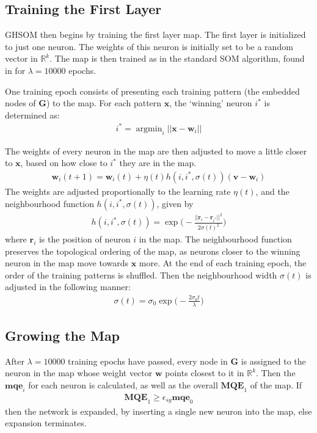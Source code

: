 \documentclass{article}
\DeclareMathOperator*{\argmin}{argmin}
\begin{document}
\subsection{Training the First Layer}
GHSOM then begins by training the first layer map. 
The first layer is initialized to just one neuron. 
The weights of this neuron is initially set to be a random vector in $\mathbb{R}^k$. 
The map is then trained as in the standard SOM algorithm, found in \cite{kohonen1990self} for $\lambda=10000$ epochs.

One training epoch consists of presenting each training pattern (the embedded nodes of $\textbf{G}$) to the map. 
For each pattern $\textbf{x}$, the `winning' neuron $i^*$ is determined as:
\begin{align}
i^* = \argmin_i  ||\textbf{x} - \textbf{w}_i||
\end{align}

The weights of every neuron in the map are then adjusted to move a little closer to $\textbf{x}$, based on how close to $i^*$ they are in the map.
\begin{align}
\textbf{w}_i(t+1) = \textbf{w}_i(t) + \eta(t) h(i, i^*, \sigma(t)) (\textbf{v} - \textbf{w}_i)
\end{align}
The weights are adjusted proportionally to the learning rate $\eta(t)$, and the neighbourhood function $h(i, i^*, \sigma(t))$, given by
\begin{align}
h(i, i^*, \sigma(t)) = \exp\Bigg(-\frac{||\textbf{r}_i-\textbf{r}_{i^*}||^2}{2\sigma(t)^2}\Bigg)
\end{align}
where $\textbf{r}_i$ is the position of neuron $i$ in the map.
The neighbourhood function preserves the topological ordering of the map, as neurons closer to the winning neuron in the map move towards $\textbf{x}$ more.
At the end of each training epoch, the order of the training patterns is shuffled. Then the neighbourhood width $\sigma(t)$ is adjusted in the following manner:
\begin{align}
\sigma(t) = \sigma_0 \exp \Bigg(-\frac{2 \sigma_0 t}{\lambda}\Bigg)
\end{align}




\subsection{Growing the Map}
After $\lambda=10000$ training epochs have passed, every node in $\textbf{G}$ is assigned to the neuron in the map whose weight vector $\textbf{w}$ points closest to it in $\mathbb{R}^k$. 
Then the $\textbf{mqe}_i$ for each neuron is calculated, as well as the overall $\textbf{MQE}_1$ of the map. 
If 
\begin{align}
\textbf{MQE}_1 \geq \epsilon_{sg} \textbf{mqe}_0
\end{align}
then the network is expanded, by inserting a single new neuron into the map, else expansion terminates.
\end{document}
